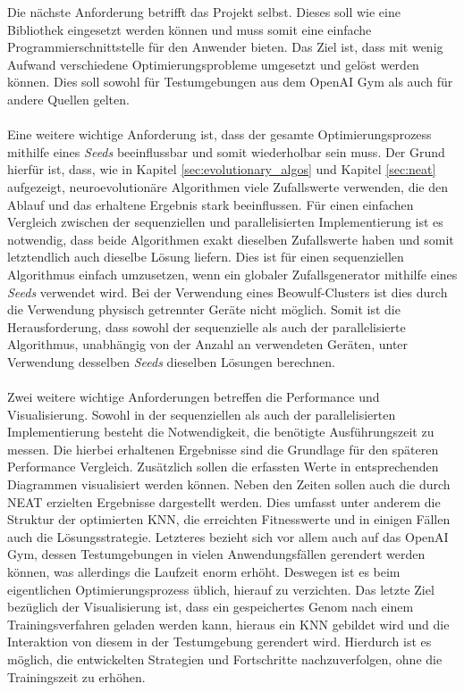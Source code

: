 Die nächste Anforderung betrifft das Projekt selbst. Dieses soll wie eine Bibliothek eingesetzt werden können und muss somit eine einfache Programmierschnittstelle für den Anwender bieten. Das Ziel ist, dass mit wenig Aufwand verschiedene Optimierungsprobleme umgesetzt und gelöst werden können. Dies soll sowohl für Testumgebungen aus dem OpenAI Gym als auch für andere Quellen gelten. 
\\\\ %
Eine weitere wichtige Anforderung ist, dass der gesamte Optimierungsprozess mithilfe eines \emph{Seeds} beeinflussbar und somit wiederholbar sein muss. Der Grund hierfür ist, dass, wie in Kapitel \ref{sec:evolutionary_algos} und Kapitel \ref{sec:neat} aufgezeigt, neuroevolutionäre Algorithmen viele Zufallswerte verwenden, die den Ablauf und das erhaltene Ergebnis stark beeinflussen. Für einen einfachen Vergleich zwischen der sequenziellen und parallelisierten Implementierung ist es notwendig, dass beide Algorithmen exakt dieselben Zufallswerte haben und somit letztendlich auch dieselbe Lösung liefern. Dies ist für einen sequenziellen Algorithmus einfach umzusetzen, wenn ein globaler Zufallsgenerator mithilfe eines \emph{Seeds} verwendet wird. Bei der Verwendung eines Beowulf-Clusters ist dies durch die Verwendung physisch getrennter Geräte nicht möglich. Somit ist die Herausforderung, dass sowohl der sequenzielle als auch der parallelisierte Algorithmus, unabhängig von der Anzahl an verwendeten Geräten, unter Verwendung desselben \emph{Seeds} dieselben Lösungen berechnen.
\\\\
Zwei weitere wichtige Anforderungen betreffen die Performance und Visualisierung. Sowohl in der sequenziellen als auch der parallelisierten Implementierung besteht die Notwendigkeit, die benötigte Ausführungszeit zu messen. Die hierbei erhaltenen Ergebnisse sind die Grundlage für den späteren Performance Vergleich. Zusätzlich sollen die erfassten Werte in entsprechenden Diagrammen visualisiert werden können. Neben den Zeiten sollen auch die durch \ac{NEAT} erzielten Ergebnisse dargestellt werden. Dies umfasst unter anderem die Struktur der optimierten \ac{KNN}, die erreichten Fitnesswerte und in einigen Fällen auch die Lösungsstrategie. Letzteres bezieht sich vor allem auch auf das OpenAI Gym, dessen Testumgebungen in vielen Anwendungsfällen gerendert werden können, was allerdings die Laufzeit enorm erhöht. Deswegen ist es beim eigentlichen Optimierungsprozess üblich, hierauf zu verzichten. Das letzte Ziel bezüglich der Visualisierung ist, dass ein gespeichertes Genom nach einem Trainingsverfahren geladen werden kann, hieraus ein \ac{KNN} gebildet wird und die Interaktion von diesem in der Testumgebung gerendert wird. Hierdurch ist es möglich, die entwickelten Strategien und Fortschritte nachzuverfolgen, ohne die Trainingszeit zu erhöhen.
